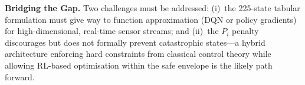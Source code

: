 \documentclass[12pt, a4paper, oneside]{report}
\begin{document}
\textbf{Bridging the Gap.}
Two challenges must be addressed: (i)~the 225-state tabular formulation must give way to function approximation (DQN or policy gradients) for high-dimensional, real-time sensor streams; and (ii)~the $P_i$ penalty discourages but does not formally prevent catastrophic states---a hybrid architecture enforcing hard constraints from classical control theory while allowing RL-based optimisation within the safe envelope is the likely path forward.



\end{document}
